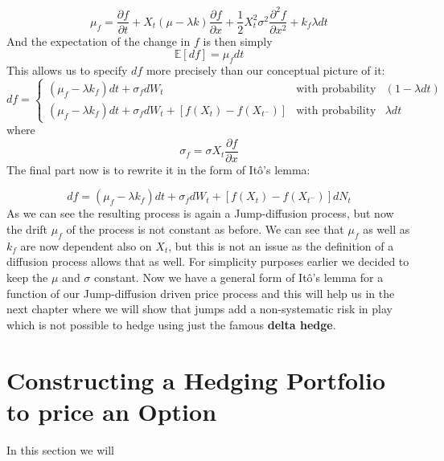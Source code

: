\documentclass[times, utf8, diplomski]{fer}
\begin{document}
\begin{equation}
	\mu_f = \frac{\partial f}{\partial t} + X_t(\mu - \lambda k)\frac{\partial f}{\partial x} + \frac{1}{2}X_t^2\sigma^2\frac{\partial^2 f}{\partial x^2} + k_f \lambda dt
\end{equation}
And the expectation of the change in $f$ is then simply
$$
	\mathbb{E}[df] = \mu_f dt
$$
This allows us to specify $df$ more precisely than our conceptual picture of it:
$$
	df = \left\{  \begin{array}{lcl} (\mu_f - \lambda k_f)dt + \sigma_f dW_t & \mbox{with probability} & (1 - \lambda dt) \\
			  (\mu_f - \lambda k_f)dt + \sigma_f dW_t + [f(X_t) - f(X_{t^-})] & \mbox{with probability} & \lambda dt \end{array} \right. 
$$ where $$ \sigma_f = \sigma X_t\frac{\partial f}{\partial x} $$
The final part now is to rewrite it in the form of It\^{o}'s lemma:

\begin{equation} \label{eqn_ito_lemma_jd}
	df = (\mu_f - \lambda k_f)dt + \sigma_f dW_t + [f(X_t) - f(X_{t^-})]dN_t
\end{equation}
As we can see the resulting process is again a Jump-diffusion process, but now the drift $\mu_f$ of the process is not constant as before. We can see that $\mu_f$ as well as $k_f$ are now dependent also on $X_t$, but this is not an issue as the definition of a diffusion process allows that as well. For simplicity purposes earlier we decided to keep the $\mu$ and $\sigma$ constant. Now we have a general form of It\^{o}'s lemma for a function of our Jump-diffusion driven price process and this will help us in the next chapter where we will show that jumps add a non-systematic risk in play which is not possible to hedge using just the famous \textbf{delta hedge}.

\section{Constructing a Hedging Portfolio to price an Option}
In this section we will 
\end{document}
